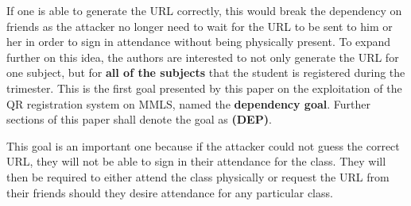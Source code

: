 \documentclass[runningheads]{llncs}
\begin{document}
If one is able to generate the URL correctly, this would break the dependency on friends as the attacker no longer need to wait for the URL to be sent to him or her in order to sign in attendance without being physically present. To expand further on this idea, the authors are interested to not only generate the URL for one subject, but for \textbf{all of the subjects} that the student is registered during the trimester. This is the first goal presented by this paper on the exploitation of the QR registration system on MMLS, named the \textbf{dependency goal}. Further sections of this paper shall denote the goal as \textbf{(DEP)}. 

This goal is an important one because if the attacker could not guess the correct URL, they will not be able to sign in their attendance for the class. They will then be required to either attend the class physically or request the URL from their friends should they desire attendance for any particular class.
\end{document}
